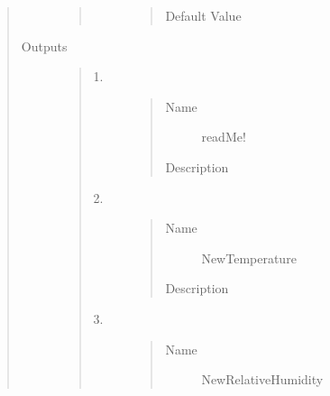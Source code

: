 \documentclass[letterpaper,10pt,english]{sphinxmanual}
\begin{document}
\begin{quote}
\begin{description}
\begin{quote}
\begin{description}
\begin{quote}
\begin{description}
\item[{Default Value}] \leavevmode
{}

\end{description}\end{quote}

\end{description}\end{quote}

\item[{Outputs}] \leavevmode\begin{quote}\begin{description}
\item[{1.}] \leavevmode\begin{quote}\begin{description}
\item[{Name}] \leavevmode
readMe!

\item[{Description}] \leavevmode
{}

\end{description}\end{quote}

\item[{2.}] \leavevmode\begin{quote}\begin{description}
\item[{Name}] \leavevmode
NewTemperature

\item[{Description}] \leavevmode
{}

\end{description}\end{quote}

\item[{3.}] \leavevmode\begin{quote}\begin{description}
\item[{Name}] \leavevmode
NewRelativeHumidity


\end{description}
\end{quote}
\end{description}
\end{quote}
\end{description}
\end{quote}
\end{document}
